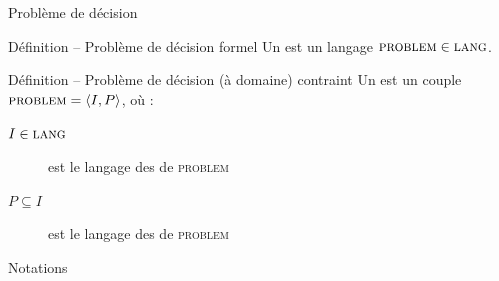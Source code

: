 
\begingroup

\newcommand\PROBLEM{\textsc{problem}}

\begin{frame}{Problème de décision}

  \begin{block}{Définition -- Problème de décision formel}
    Un  est un langage \alert{$\PROBLEM{} \in \textsc{lang}$}. 
  \end{block}

  \begin{block}{Définition -- Problème de décision (à domaine) contraint}
    Un  est un couple \alert{$\PROBLEM{} = \langle I, P \rangle$}, où :
    \begin{description}
    \item[$I \in \textsc{lang}$] est le langage des  de \PROBLEM{}
    \item[$P \subseteq I$] est le langage des  de \PROBLEM{}
    \end{description}
  \end{block}
  
  \begin{block}{Notations}
  \end{block}

\end{frame}

\endgroup
\endinput

